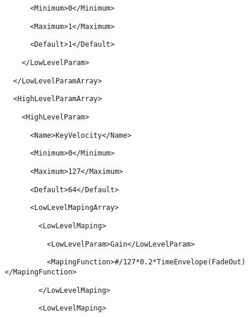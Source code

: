 \documentclass[a4paper,english,american]{book}
\begin{document}
{\begin{spacing}{0.8}
\texttt{\footnotesize ~~~~~~<Minimum>0</Minimum>}{\footnotesize\par
}
\par
\texttt{\footnotesize ~~~~~~<Maximum>1</Maximum>}{\footnotesize\par
}
\par
\texttt{\footnotesize ~~~~~~<Default>1</Default>}{\footnotesize\par
}
\par
\texttt{\footnotesize ~~~~</LowLevelParam>}{\footnotesize\par
}
\par
\texttt{\footnotesize ~~</LowLevelParamArray>}{\footnotesize\par
}
\par
\texttt{\footnotesize ~~<HighLevelParamArray>}{\footnotesize\par
}
\par
\texttt{\footnotesize ~~~~<HighLevelParam>}{\footnotesize\par
}
\par
\texttt{\footnotesize ~~~~~~<Name>KeyVelocity</Name>}{\footnotesize\par
}
\par
\texttt{\footnotesize ~~~~~~<Minimum>0</Minimum>}{\footnotesize\par
}
\par
\texttt{\footnotesize ~~~~~~<Maximum>127</Maximum>}{\footnotesize\par
}
\par
\texttt{\footnotesize ~~~~~~<Default>64</Default>}{\footnotesize\par
}
\par
\texttt{\footnotesize ~~~~~~<LowLevelMapingArray>}{\footnotesize\par
}
\par
\texttt{\footnotesize ~~~~~~~~<LowLevelMaping>}{\footnotesize\par
}
\par
\texttt{\footnotesize ~~~~~~~~~~<LowLevelParam>Gain</LowLevelParam>}{\footnotesize\par
}
\par
\texttt{\footnotesize ~~~~~~~~~~<MapingFunction>\#/127{*}0.2{*}TimeEnvelope(FadeOut)</MapingFunction>}{\footnotesize\par
}
\par
\texttt{\footnotesize ~~~~~~~~</LowLevelMaping>}{\footnotesize\par
}
\par
\texttt{\footnotesize ~~~~~~~~<LowLevelMaping>}{\footnotesize\par
}
\end{spacing}}
\end{document}
